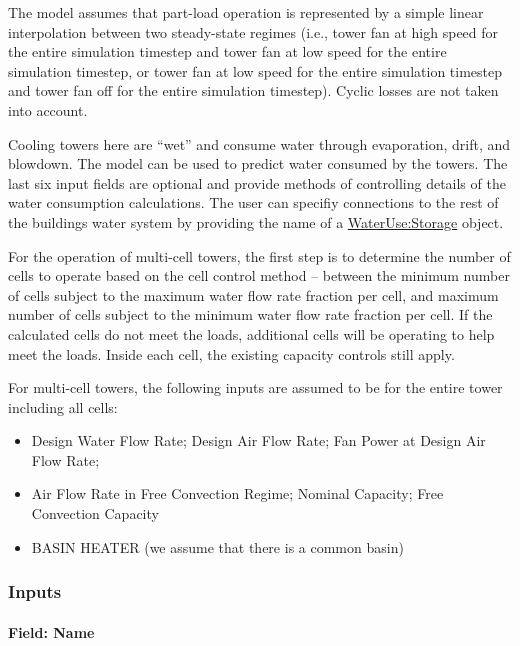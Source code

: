 The model assumes that part-load operation is represented by a simple linear interpolation between two steady-state regimes (i.e., tower fan at high speed for the entire simulation timestep and tower fan at low speed for the entire simulation timestep, or tower fan at low speed for the entire simulation timestep and tower fan off for the entire simulation timestep). Cyclic losses are not taken into account.

Cooling towers here are ``wet'' and consume water through evaporation, drift, and blowdown. The model can be used to predict water consumed by the towers. The last six input fields are optional and provide methods of controlling details of the water consumption calculations. The user can specifiy connections to the rest of the buildings water system by providing the name of a \hyperref[waterusestorage]{WaterUse:Storage} object.

For the operation of multi-cell towers, the first step is to determine the number of cells to operate based on the cell control method -- between the minimum number of cells subject to the maximum water flow rate fraction per cell, and maximum number of cells subject to the minimum water flow rate fraction per cell. If the calculated cells do not meet the loads, additional cells will be operating to help meet the loads. Inside each cell, the existing capacity controls still apply.

For multi-cell towers, the following inputs are assumed to be for the entire tower including all cells:

\begin{itemize}
\item
  Design Water Flow Rate; Design Air Flow Rate; Fan Power at Design Air Flow Rate;
\item
  Air Flow Rate in Free Convection Regime; Nominal Capacity; Free Convection Capacity
\item
  BASIN HEATER (we assume that there is a common basin)
\end{itemize}

\subsubsection{Inputs}\label{inputs-1-006}

\paragraph{Field: Name}\label{ct-twospeed-field-name}

